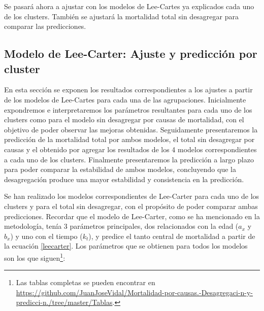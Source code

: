 \documentclass{article}
\begin{document}
Se pasará ahora a ajustar con los modelos de Lee-Cartes ya explicados cada uno de los clusters. También se ajustará la mortalidad total sin desagregar para comparar las predicciones.

\subsection{Modelo de Lee-Carter: Ajuste y predicción por cluster}

En esta sección se exponen los resultados correspondientes a los ajustes a partir de los modelos de Lee-Cartes para cada una de las agrupaciones. Inicialmente expondremos e interpretaremos los parámetros resultantes para cada uno de los clusters como para el modelo sin desagregar por causas de mortalidad, con el objetivo de poder observar las mejoras obtenidas. Seguidamente presentaremos la predicción de la mortalidad total por ambos modelos, el total sin desagregar por causas y el obtenido por agregar los resultados de los 4 modelos correspondientes a cada uno de los clusters. Finalmente presentaremos la predicción a largo plazo para poder comparar la estabilidad de ambos modelos, concluyendo que la desagregación produce una mayor estabilidad y consistencia en la predicción.

Se han realizado los modelos correspondientes de Lee-Carter para cada uno de los clusters y para el total sin desagregar, con el propósito de poder comparar ambas predicciones. Recordar que el modelo de Lee-Carter,  como se ha mencionado en la metodología, tenía 3 parámetros principales, dos relacionados con la edad ($a_{x}$ y $b_{x}$) y uno con el tiempo ($k_{t}$), y predice el tanto central de mortalidad a partir de la ecuación \ref{leecarter}. Los parámetros que se obtienen para todos los modelos son los que siguen\footnote{Las tablas completas se pueden encontrar en \url{https://github.com/JuanJoseVidal/Mortalidad-por-causas.-Desagregaci-n-y-predicci-n./tree/master/Tablas}.}:
\end{document}
